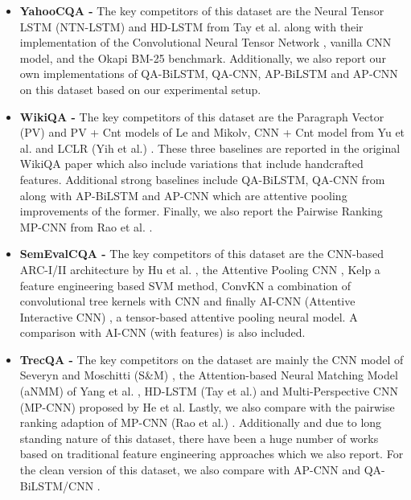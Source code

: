 \documentclass[sigconf]{acmart}
\begin{document}
\begin{itemize}


\item \textbf{YahooCQA -}
The key competitors of this dataset are the Neural Tensor LSTM (NTN-LSTM) and HD-LSTM from Tay et al. \cite{DBLP:conf/sigir/TayPLH17} along with their implementation of the Convolutional Neural Tensor Network \cite{DBLP:conf/ijcai/QiuH15}, vanilla CNN model, and the Okapi BM-25 \cite{DBLP:conf/trec/RobertsonWJHG94} benchmark. Additionally, we also report our own implementations of QA-BiLSTM, QA-CNN, AP-BiLSTM and AP-CNN on this dataset based on our experimental setup.

\item \textbf{WikiQA -}
The key competitors of this dataset are the Paragraph Vector (PV) and PV + Cnt models \cite{le2014distributed} of Le and Mikolv, CNN + Cnt model from Yu et al. \cite{DBLP:journals/corr/YuHBP14} and LCLR (Yih et al.) \cite{DBLP:conf/acl/YihCMP13}. These three baselines are reported in the original WikiQA paper \cite{DBLP:conf/emnlp/YangYM15} which also include variations that include handcrafted features. Additional strong baselines include QA-BiLSTM, QA-CNN from \cite{DBLP:journals/corr/SantosTXZ16} along with AP-BiLSTM and AP-CNN which are attentive pooling improvements of the former. Finally, we also report the Pairwise Ranking MP-CNN from Rao et al. \cite{DBLP:conf/cikm/RaoHL16}.

\item \textbf{SemEvalCQA -}
The key competitors of this dataset are the CNN-based ARC-I/II architecture by Hu et al. \cite{DBLP:conf/nips/HuLLC14}, the Attentive Pooling CNN \cite{DBLP:journals/corr/SantosTXZ16}, Kelp \cite{DBLP:conf/semeval/FiliceCMB16} a feature engineering based SVM method, ConvKN \cite{DBLP:conf/semeval/Barron-CedenoMJ16} a combination of convolutional tree kernels with CNN and finally  AI-CNN (Attentive Interactive CNN) \cite{DBLP:conf/aaai/ZhangLSW17}, a tensor-based attentive pooling neural model. A comparison with AI-CNN (with features) is also included. 

\item \textbf{TrecQA -} 
The key competitors on the dataset are mainly the CNN model of Severyn and Moschitti (S\&M) \cite{DBLP:conf/sigir/SeverynM15}, the Attention-based Neural Matching Model (aNMM) of Yang et al. \cite{DBLP:conf/cikm/YangAGC16}, HD-LSTM (Tay et al.) \cite{DBLP:conf/sigir/TayPLH17} and Multi-Perspective CNN (MP-CNN) \cite{DBLP:conf/emnlp/HeGL15} proposed by He et al. Lastly, we also compare with the pairwise ranking adaption of MP-CNN (Rao et al.) \cite{DBLP:conf/cikm/RaoHL16}. Additionally and due to long standing nature of this dataset, there have been a huge number of works based on traditional feature engineering approaches \cite{DBLP:conf/emnlp/WangSM07,DBLP:conf/naacl/HeilmanS10a,DBLP:conf/sigir/SeverynMTBR14,DBLP:conf/naacl/YaoDCC13} which we also report. For the clean version of this dataset, we also compare with AP-CNN and QA-BiLSTM/CNN \cite{DBLP:journals/corr/SantosTXZ16}.

\end{itemize}
\end{document}
